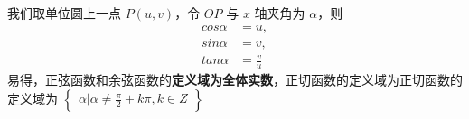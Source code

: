 \begin{issues}
\issueDraft
\end{issues}

我们取单位圆上一点 $P(u,v)$，令 $OP$ 与 $x$ 轴夹角为 $\alpha$，则 
\begin{equation}
\begin{aligned}
cos\alpha &= u,\\
sin\alpha &= v,\\
tan\alpha &= \frac{v}{u}
\end{aligned}
\end{equation}
易得，正弦函数和余弦函数的\textbf{定义域为全体实数}，正切函数的定义域为正切函数的定义域为 $\begin{Bmatrix}\alpha|\alpha \neq \frac{\pi}{2}+k\pi,k\in Z\end{Bmatrix}$